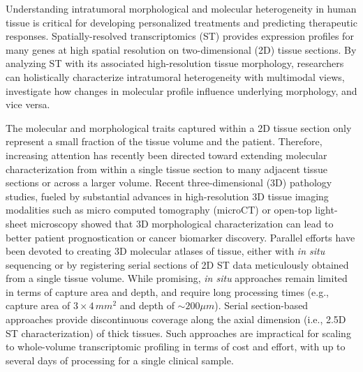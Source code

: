 
Understanding intratumoral morphological and molecular heterogeneity in human tissue is critical for developing personalized treatments and predicting therapeutic responses\cite{song2023artificial, marusyk2020intratumor, vitale2021intratumoral, fu2021spatial, bagaev2021conserved, arora2023spatial}.
Spatially-resolved transcriptomics (ST) provides expression profiles for many genes at high spatial resolution on two-dimensional (2D) tissue sections\cite{staahl2016visualization, rao2021exploring, rodriques2019slide, marx2021method, moses2022museum, palla2022spatial, ren2024spatial}. 
By analyzing ST with its associated high-resolution tissue morphology, researchers can holistically characterize intratumoral heterogeneity with multimodal views, investigate how changes in molecular profile influence underlying morphology, and vice versa.

The molecular and morphological traits captured within a 2D tissue section only represent a small fraction of the tissue volume and the patient\cite{liu2021harnessing, song2023artificial, braxton20243d, mo2024tumour, erturk2024deep, wang20243d, mathur2024glioblastoma}. Therefore, increasing attention has recently been directed toward extending molecular characterization from within a single tissue section to many adjacent tissue sections or across a larger volume. Recent three-dimensional (3D) pathology studies, fueled by substantial advances in high-resolution 3D tissue imaging modalities such as micro computed tomography (microCT) or open-top light-sheet microscopy\cite{withers2021x, liu2021harnessing, bishop2024end} showed that 3D morphological characterization can lead to better patient prognostication or cancer biomarker discovery\cite{song2024analysis, xie2022prostate, erturk2024deep}. 
Parallel efforts have been devoted to creating 3D molecular atlases of tissue, either with \textit{in situ} sequencing\cite{wang2018three, wang2021easi, fang2024three, sui2024scalable,doi:10.1126/science.adq2084} or by registering serial sections of 2D ST data meticulously obtained from a single tissue volume\cite{dong2022deciphering, vickovic2022three, zeira2022alignment, zhou2023integrating,wang2023construction, lin2023multiplexed, schott2024open, tang2024search,shu2024efficient}. While promising, \textit{in situ} approaches remain limited in terms of capture area and depth, and require long processing times (e.g., capture area of $3\times 4\, mm^2$ and depth of $\sim 200 \mu m$). Serial section-based approaches provide discontinuous coverage along the axial dimension (i.e., 2.5D ST characterization) of thick tissues. Such approaches are impractical for scaling to whole-volume transcriptomic profiling in terms of cost and effort, with up to several days of processing for a single clinical sample.


